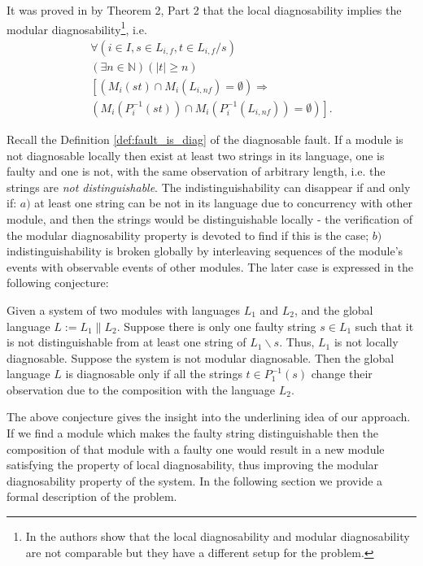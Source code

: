 \documentclass[letterpaper, 10pt, conference]{ieeeconf}
\begin{document}
It was proved in \cite{contant_diagnosability_2006} by Theorem 2, Part 2 
that the local diagnosability implies the modular diagnosability\footnote{In
\cite{zhou_decentralized_2008} the authors show that the local diagnosability
and modular diagnosability are not comparable but they have a different setup
for the problem.}, i.e.
\begin{equation}
\begin{array}{l}
	\forall(i \in I, s \in L_{i,f}, t \in L_{i,f}/s)
	\\
	(\exists n \in \mathbb{N})
	(|t| \geq n)
	\\
	\left[
	\left( M_i(st) \cap M_i(L_{i,nf}) = \emptyset \right)
	\Rightarrow \right.
	\\ 
	\left.
	\left( M_i(P_i^{-1}(st)) \cap M_i(P_i^{-1}(L_{i,nf})) = \emptyset \right)
	\right].
\end{array}
\end{equation}


Recall the Definition \ref{def:fault_is_diag} of the diagnosable fault. If a
module is not diagnosable locally then exist at least two strings in its
language, one is faulty and one is not, with the same observation of arbitrary
length, i.e. the strings are \emph{not distinguishable}. The
indistinguishability can disappear if and only if:
$a)$ at least one string can be not in its language due to concurrency with other
module, and then the strings would be distinguishable locally - the verification
of the modular diagnosability property is devoted to find if this is the case;
$b)$ indistinguishability is broken globally by interleaving sequences of the
module's events with observable events of other modules. The later case is
expressed in the following conjecture:
\begin{conjecture} Given a system of two modules with languages $L_1$ and $L_2$,
and the global language $L := L_1 \parallel L_2$. Suppose there is only
one faulty string $s \in L_1$ such that it is not distinguishable from at least one
string of $L_1\backslash s$. Thus, $L_1$ is not locally diagnosable. Suppose the
system is not modular diagnosable. Then the global language $L$ is diagnosable
only if all the strings $t \in P_1^{-1}(s)$ change their observation due to 
the composition with the language $L_2$.
\end{conjecture}

The above conjecture gives the insight into the underlining idea of our
approach. If we find a module which makes the faulty string distinguishable
then the composition of that module with a faulty one would result in a new
module satisfying the property of local diagnosability, thus improving
the modular diagnosability property of the system. In the following section we
provide a formal description of the problem.
\end{document}
